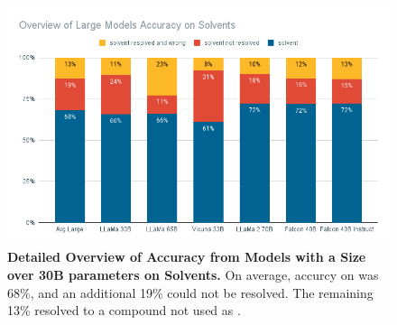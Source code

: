 \begin{figure}[!htb]
    \begin{centering}
        \includegraphics[width=\textwidth]{img/overview_large_solv}
        \caption[Large Models Detailed Solvent Accuracy]{\textbf{Detailed Overview of Accuracy from Models with a Size over 30B parameters on Solvents.}
            On average, accurcy on \tsolv was 68\%, and an additional 19\% could not be resolved. The remaining 13\% resolved to a compound not used as \tsolv.
        }
        \label{fig:large_solv}
    \end{centering}
\end{figure}

